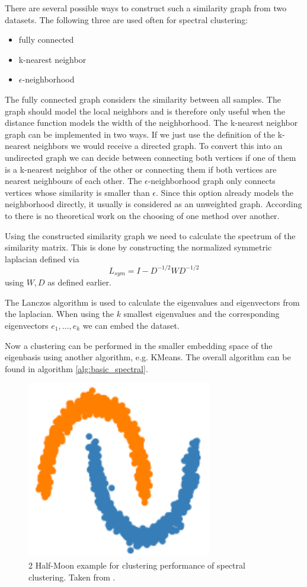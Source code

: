 There are several possible ways to construct such a similarity graph from two datasets.
The following three are used often for spectral clustering:
\begin{itemize}
  \item fully connected
  \item k-nearest neighbor
  \item \(\epsilon\)-neighborhood
\end{itemize}
The fully connected graph considers the similarity between all samples. The graph should model the local neighbors and is therefore only useful when the distance function
models the width of the neighborhood.
The k-nearest neighbor graph can be implemented in two ways. If we just use the definition of the k-nearest neighbors we would receive a directed graph.
To convert this into an undirected graph we can decide between connecting both vertices if one of them is a k-nearest neighbor of the other or connecting them if both vertices are nearest neighbours of each other.
The \(\epsilon\)-neighborhood graph only connects vertices whose similarity is smaller than \(\epsilon\).
Since this option already models the neighborhood directly, it usually is considered as an unweighted graph. \cite{von_luxburg_tutorial_2007}
According to \cite{von_luxburg_tutorial_2007} there is no theoretical work on the choosing of one method over
another.

Using the constructed similarity graph we need to calculate the spectrum of the similarity matrix.
This is done by constructing the normalized symmetric laplacian defined via
\[L_{sym} = I - D^{-1/2} W D^{-1/2}\]
using \(W, D\) as defined earlier.

The Lanczos algorithm \cite{lanczos_iteration_1950} is used to calculate the eigenvalues and eigenvectors from the laplacian.
When using the \(k\) smallest eigenvalues and the corresponding eigenvectors \(e_1, \ldots, e_k\) we can embed the dataset.

Now a clustering can be performed in the smaller embedding space of the eigenbasis using another algorithm, e.g. KMeans.
The overall algorithm can be found in algorithm \ref{alg:basic_spectral}.

\begin{figure}
  \includegraphics{images/spectral_example.png}
  \caption{2 Half-Moon example for clustering performance of spectral clustering. Taken from \cite{noauthor_23_2020}.}
  \label{fig:spectral_example}
\end{figure}

